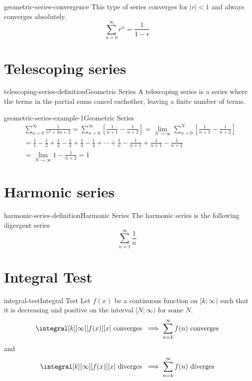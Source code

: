 \documentclass[preview]{standalone}
\begin{document}
\begin{snippet}{geometric-series-convergence}
This type of series converges for \(|r| < 1\) and always converges absolutely.
\[
    \sum_{n=0}^\infty r^n = \frac{1}{1-r}
\]
\end{snippet}

\section{Telescoping series}

\begin{snippetdefinition}{telescoping-series-definition}{Geometric Series}{
    A telescoping series is a series where the terms in the partial sums cancel eachother,
    leaving a finite number of terms.
}
\end{snippetdefinition}

\begin{snippetexample}{geometric-series-example-1}{Geometric Series}{
    \begin{align*}
        &\sum_{n=0}^\infty \frac{1}{n^2 + 3n + 2}
        = \sum_{n=0}^\infty \left[ \frac{1}{n+1} - \frac{1}{n+2} \right]
        = \lim_{N \to \infty} \sum_{n=0}^N \left[ \frac{1}{n+1} - \frac{1}{n+2} \right] \\
        &= \frac{1}{1} - \frac{1}{2} + \frac{1}{2} - \frac{1}{3}
        + \frac{1}{3} - \frac{1}{4} + \cdots + \frac{1}{n} - \frac{1}{n+1} +
        \frac{1}{n+1} - \frac{1}{n+2} \\
        &= \lim_{N \to \infty} 1 - \frac{1}{n+2} = 1
    \end{align*}
}
\end{snippetexample}

\section{Harmonic series}

\begin{snippetdefinition}{harmonic-series-definition}{Harmonic Series}{
    The harmonic series is the following digergent series
    \[
        \sum_{n=1}^\infty \frac{1}{n}
    \]
}
\end{snippetdefinition}

\section{Integral Test}

\begin{snippetdefinition}{integral-test}{Integral Test}{
    Let \(f(x)\) be a continuous function on \([k;\infty)\)
    such that it is decreasing and positive on the interval \([N; \infty)\)
    for some \(N\).
    \[
        \integral[k][\infty][f(x)][x] \text{ converges } \implies
        \sum_{n=k}^{\infty} f(n) \text{ converges}
    \]
    and
    \[
        \integral[k][\infty][f(x)][x] \text{ diverges } \implies
        \sum_{n=k}^{\infty} f(n) \text{ diverges}
    \]
}
\end{snippetdefinition}
\end{document}
